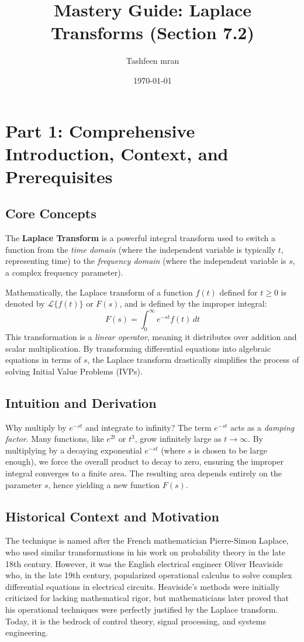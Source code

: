 \documentclass[11pt, a4paper]{article}
\title{\textbf{Mastery Guide: Laplace Transforms (Section 7.2)}}
\author{Tashfeen mran}
\date{\today}
\theoremstyle{definition}
\theoremstyle{remark}
\begin{document}
\maketitle
\tableofcontents
\newpage

\section{Part 1: Comprehensive Introduction, Context, and Prerequisites}

\subsection{Core Concepts}
The \textbf{Laplace Transform} is a powerful integral transform used to switch a function from the \textit{time domain} (where the independent variable is typically $t$, representing time) to the \textit{frequency domain} (where the independent variable is $s$, a complex frequency parameter). 

Mathematically, the Laplace transform of a function $f(t)$ defined for $t \ge 0$ is denoted by $\mathscr{L}\{f(t)\}$ or $F(s)$, and is defined by the improper integral:
\[
F(s) = \int_{0}^{\infty} e^{-st} f(t) \, dt
\]
This transformation is a \textit{linear operator}, meaning it distributes over addition and scalar multiplication. By transforming differential equations into algebraic equations in terms of $s$, the Laplace transform drastically simplifies the process of solving Initial Value Problems (IVPs).

\subsection{Intuition and Derivation}
Why multiply by $e^{-st}$ and integrate to infinity? The term $e^{-st}$ acts as a \textit{damping factor}. Many functions, like $e^{2t}$ or $t^3$, grow infinitely large as $t \to \infty$. By multiplying by a decaying exponential $e^{-st}$ (where $s$ is chosen to be large enough), we force the overall product to decay to zero, ensuring the improper integral converges to a finite area. The resulting area depends entirely on the parameter $s$, hence yielding a new function $F(s)$.

\subsection{Historical Context and Motivation}
The technique is named after the French mathematician Pierre-Simon Laplace, who used similar transformations in his work on probability theory in the late 18th century. However, it was the English electrical engineer Oliver Heaviside who, in the late 19th century, popularized operational calculus to solve complex differential equations in electrical circuits. Heaviside's methods were initially criticized for lacking mathematical rigor, but mathematicians later proved that his operational techniques were perfectly justified by the Laplace transform. Today, it is the bedrock of control theory, signal processing, and systems engineering.
\end{document}
